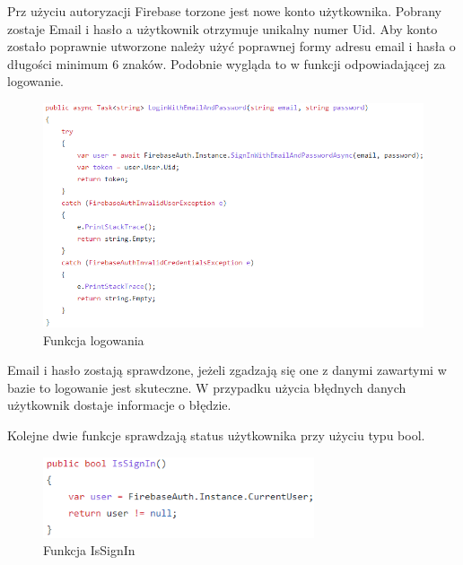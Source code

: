 Prz użyciu autoryzacji Firebase torzone jest nowe konto użytkownika. Pobrany zostaje Email i hasło a użytkownik otrzymuje unikalny numer Uid. Aby konto zostało poprawnie utworzone należy użyć poprawnej formy adresu email i hasła o długości minimum 6 znaków. \newline 
Podobnie wygląda to w funkcji odpowiadającej za logowanie. 

\begin{figure}[!htb]
	\begin{center}
		\includegraphics[width=16cm]{rys/authdroid2.png}
		\caption{Funkcja logowania}
		\label{rys:rysunek025}
	\end{center}
\end{figure}

Email i hasło zostają sprawdzone, jeżeli zgadzają się one z danymi zawartymi w bazie to logowanie jest skuteczne. W przypadku użycia błędnych danych użytkownik dostaje informacje o błędzie. \newline \newline

Kolejne dwie funkcje sprawdzają status użytkownika przy użyciu typu bool.

\begin{figure}[!htb]
	\begin{center}
		\includegraphics[width=8cm]{rys/authdroid3.png}
		\caption{Funkcja IsSignIn}
		\label{rys:rysunek026}
	\end{center}
\end{figure}  

